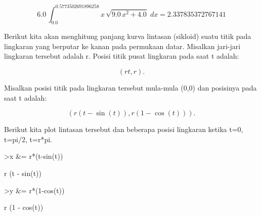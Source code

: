 \documentclass{article}
\begin{document}
\begin{eulernotebook}
\begin{eulercomment}
\begin{eulercomment}
\begin{eulercomment}
\begin{eulercomment}
\begin{eulerformula}
\[
6.0\,\int_{0.0}^{0.5773502691896258}{x\,\sqrt{9.0\,x^2+4.0}\;dx}=  2.337835372767141
\]
\end{eulerformula}
\begin{eulercomment}
Berikut kita akan menghitung panjang kurva lintasan (sikloid) suatu
titik pada lingkaran yang berputar ke kanan pada permukaan datar.
Misalkan jari-jari lingkaran tersebut adalah r. Posisi titik pusat
lingkaran pada saat t adalah:

\end{eulercomment}
\begin{eulerformula}
\[
(rt,r).
\]
\end{eulerformula}
\begin{eulercomment}
Misalkan posisi titik pada lingkaran tersebut mula-mula (0,0) dan
posisinya pada saat t adalah:

\end{eulercomment}
\begin{eulerformula}
\[
(r(t-\sin(t)),r(1-\cos(t))).
\]
\end{eulerformula}
\begin{eulercomment}
Berikut kita plot lintasan tersebut dan beberapa posisi lingkaran
ketika t=0, t=pi/2, t=r*pi.
\end{eulercomment}
\begin{eulerprompt}
>x &= r*(t-sin(t))
\end{eulerprompt}
\begin{euleroutput}
  
                              r (t - sin(t))
  
\end{euleroutput}
\begin{eulerprompt}
>y &= r*(1-cos(t))
\end{eulerprompt}
\begin{euleroutput}
  
                              r (1 - cos(t))
  

\end{euleroutput}
\end{eulercomment}
\end{eulercomment}
\end{eulercomment}
\end{eulercomment}
\end{eulernotebook}
\end{document}
